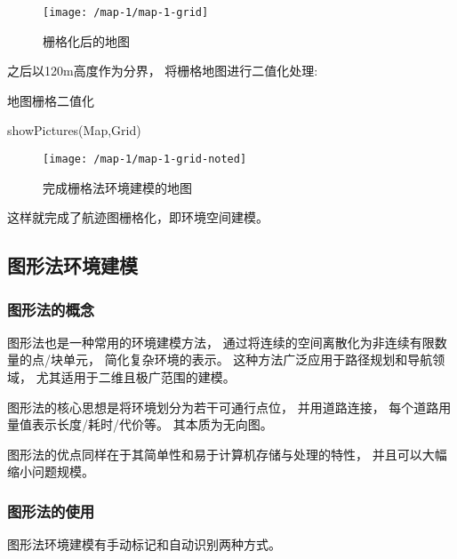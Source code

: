 \documentclass[12pt,a4paper,oneside,UTF8]{ctexart}
\begin{document}
\begin{figure}[H]
  \centering
  \texttt{[image: /map-1/map-1-grid]}
  \caption{栅格化后的地图}
  \label{fig:map-1-grid}
\end{figure}

之后以120m高度作为分界，
将栅格地图进行二值化处理:

\begin{algorithm}[H]
  \caption{地图栅格二值化}\label{algorithm-grid-noted}

  showPictures(Map,Grid)\;
\end{algorithm}

\begin{figure}[H]
  \centering
  \texttt{[image: /map-1/map-1-grid-noted]}
  \caption{完成栅格法环境建模的地图}
  \label{fig:map-1-grid-noted}
\end{figure}

这样就完成了航迹图栅格化，即环境空间建模。
\subsection{图形法环境建模}
\subsubsection{图形法的概念}
图形法也是一种常用的环境建模方法，
通过将连续的空间离散化为非连续有限数量的点/块单元，
简化复杂环境的表示。
这种方法广泛应用于路径规划和导航领域，
尤其适用于二维且极广范围的建模。

图形法的核心思想是将环境划分为若干可通行点位，
并用道路连接，
每个道路用量值表示长度/耗时/代价等。
其本质为无向图。

图形法的优点同样在于其简单性和易于计算机存储与处理的特性，
并且可以大幅缩小问题规模。
\subsubsection{图形法的使用}
图形法环境建模有手动标记和自动识别两种方式。
\end{document}
